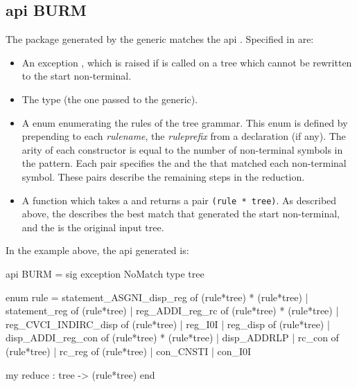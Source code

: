 	\subsection{api BURM}

The package generated by the generic  matches the
api . Specified in  are:

\begin{itemize}
 	\item An exception , which is raised if  is
called on a tree which cannot be rewritten to the start non-terminal.

 	\item The type  (the one passed to the generic).

 	\item A enum  enumerating the rules of the tree
grammar. This enum is defined by prepending to each {\sl rulename},
the {\sl ruleprefix} from a  declaration (if any).
The arity of each constructor is equal to the number of non-terminal
symbols in the pattern. Each  pair specifies the
 and the  that matched each non-terminal symbol.
These pairs describe the remaining steps in the reduction. 

	 \item A function  which takes a  and
returns a pair \verb|(rule * tree)|. As described above, the 
describes the best match that generated the start non-terminal, and the
 is the original input tree.
\end{itemize}

In the example above, the api  generated is:

\begin{centercode}
api BURM = sig
  exception NoMatch
  type tree

  enum rule = 
       statement_ASGNI_disp_reg  of (rule*tree) * (rule*tree)
     | statement_reg             of (rule*tree)
     | reg_ADDI_reg_rc      of (rule*tree) * (rule*tree)
     | reg_CVCI_INDIRC_disp of (rule*tree)
     | reg_I0I
     | reg_disp             of (rule*tree)
     | disp_ADDI_reg_con    of (rule*tree) * (rule*tree)
     | disp_ADDRLP
     | rc_con               of (rule*tree)
     | rc_reg               of (rule*tree)
     | con_CNSTI
     | con_I0I

  my reduce : tree -> (rule*tree)
end
\end{centercode}

